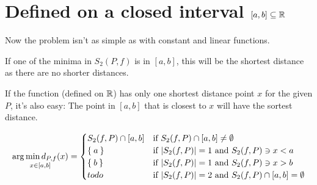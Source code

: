 \section{Defined on a closed interval $[a,b] \subseteq \mathbb{R}$}
Now the problem isn't as simple as with constant and linear
functions.

If one of the minima in $S_2(P,f)$ is in $[a,b]$, this will be the
shortest distance as there are no shorter distances.


If the function (defined on $\mathbb{R}$) has only one shortest distance
point $x$ for the given $P$, it's also easy: The point in $[a,b]$ that
is closest to $x$ will have the sortest distance.

\[\underset{x\in[a,b]}{\arg \min d_{P,f}(x)} = \begin{cases}
 S_2(f, P) \cap [a,b] &\text{if } S_2(f, P) \cap [a,b] \neq \emptyset \\
              \Set{a} &\text{if } |S_2(f, P)| = 1 \text{ and } S_2(f, P) \ni x < a\\
              \Set{b} &\text{if } |S_2(f, P)| = 1 \text{ and } S_2(f, P) \ni x > b\\
                 todo &\text{if } |S_2(f, P)| = 2 \text{ and } S_2(f, P) \cap [a,b] = \emptyset
    \end{cases}\]
